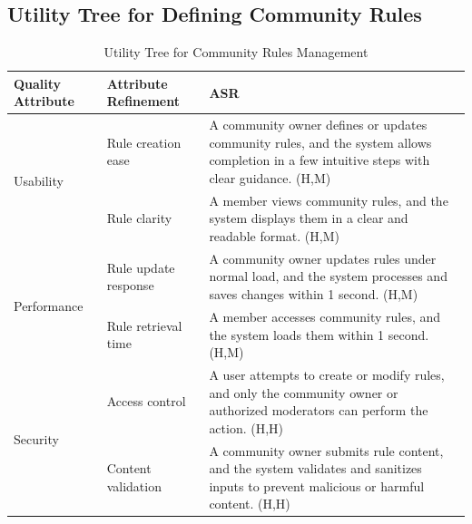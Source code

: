\documentclass{article}
\begin{document}
\subsection{Utility Tree for Defining Community Rules}

\begin{table}[H]
    \centering
    \caption{Utility Tree for Community Rules Management}
    \begin{tabular}{|p{3cm}|p{4cm}|p{7cm}|}
        \hline
        \textbf{Quality Attribute} & \textbf{Attribute Refinement}                                                                                                              & \textbf{ASR} \\
        \hline

        \multirow{2}{*}{Usability}
                                   & Rule creation ease
                                   & A community owner defines or updates community rules, and the system allows completion in a few intuitive steps with clear guidance. (H,M)                \\
        \cline{2-3}
                                   & Rule clarity
                                   & A member views community rules, and the system displays them in a clear and readable format. (H,M)                                                        \\
        \hline

        \multirow{2}{*}{Performance}
                                   & Rule update response
                                   & A community owner updates rules under normal load, and the system processes and saves changes within 1 second. (H,M)                                      \\
        \cline{2-3}
                                   & Rule retrieval time
                                   & A member accesses community rules, and the system loads them within 1 second. (H,M)                                                                       \\
        \hline

        \multirow{2}{*}{Security}
                                   & Access control
                                   & A user attempts to create or modify rules, and only the community owner or authorized moderators can perform the action. (H,H)                            \\
        \cline{2-3}
                                   & Content validation
                                   & A community owner submits rule content, and the system validates and sanitizes inputs to prevent malicious or harmful content. (H,H)                      \\
        \hline


\end{tabular}
\end{table}
\end{document}
